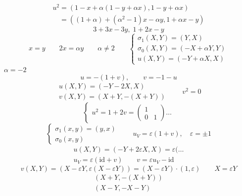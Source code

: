\documentclass[11pt,a4paper]{article}
\begin{document}
\[
\begin{array}{l}
u^2 = (1 - x + \alpha(1 - y + \alpha x), 1 - y + \alpha x) \\
\phantom{u^2} = ((1+\alpha) + (\alpha^2 - 1)x - \alpha y, 1 + \alpha x - y)
\end{array}
\]
\[
3 + 3x - 3y, \; 1 + 2x - y
\]
\[
x = y \qquad 2x = \alpha y \qquad \alpha \neq 2 \qquad
\begin{cases}
\sigma_1(X,Y) = (Y,X) \\
\sigma_0(X,Y) = (-X + \alpha Y, Y) \\
u(X,Y) = (-Y + \alpha X, X)
\end{cases}
\]
$\alpha = -2$ \quad {}
\[
u = -(1 + v), \qquad v = -1 - u
\]
\[
\begin{array}{l}
u(X,Y) = (-Y - 2X, X) \\
v(X,Y) = (X + Y, -(X + Y))
\end{array}
\qquad v^2 = 0
\]
\[
\begin{cases}
u^2 = 1 + 2v = \begin{pmatrix} 1 & \\ 0 & 1 \end{pmatrix} \ldots
\end{cases}
\]
\[
\begin{cases}
\sigma_1(x,y) = (y,x) \\
\sigma_0(x,y)
\end{cases}
\qquad u_V = \varepsilon(1 + v), \quad \varepsilon = \pm 1
\]
\[
\begin{array}{l}
u(X,Y) = (-Y + 2\varepsilon X, X) = \varepsilon( \ldots \\
u_V = \varepsilon(\mathrm{id} + v) \qquad v = \varepsilon u_V - \mathrm{id}
\end{array}
\]
\[
v(X,Y) = (X - \varepsilon Y, \varepsilon(X - \varepsilon Y)) = (X - \varepsilon Y) \cdot (1, \varepsilon)
\qquad X = \varepsilon Y
\]
\[
\begin{array}{l}
(X + Y, -(X + Y)) \\
(X - Y, -X - Y)
\end{array}
\]
\end{document}
